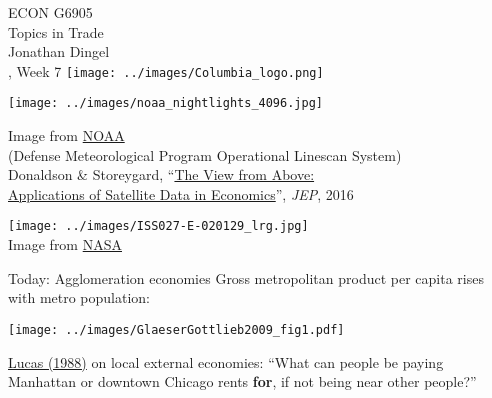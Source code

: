 \documentclass[11pt,notes=hide,aspectratio=169]{beamer}
\begin{document}
\begin{frame}[plain]
\begin{center}
\large
\textcolor{columbiadarkblue}{ECON G6905\\
Topics in Trade\\ 
Jonathan Dingel\\
\semester, Week 7}
\vfill 
\texttt{[image: ../images/Columbia\_logo.png]}
\end{center}
\end{frame}
\begin{frame}[plain]
\begin{center}
\texttt{[image: ../images/noaa\_nightlights\_4096.jpg]} \\
{\small
Image from \href{ftp://public.sos.noaa.gov/land/earth_night/nightlights/4096.jpg}{NOAA} \\
(Defense Meteorological Program Operational Linescan System)\\
Donaldson \& Storeygard, ``\href{https://www.aeaweb.org/articles?id=10.1257/jep.30.4.171}{The View from Above: \\ Applications of Satellite Data in Economics}'', \textit{JEP}, 2016
\par}
\end{center}
\end{frame}
\begin{frame}[plain]
\begin{center}
\texttt{[image: ../images/ISS027-E-020129\_lrg.jpg]} \\
Image from \href{https://visibleearth.nasa.gov/view.php?id=50671
}{NASA}
\end{center}
\end{frame}
\begin{frame}{Today: Agglomeration economies}
Gross metropolitan product per capita rises with metro population:
\begin{center}
\texttt{[image: ../images/GlaeserGottlieb2009\_fig1.pdf]}
\end{center}
\href{https://www.sciencedirect.com/science/article/pii/0304393288901687}{Lucas (1988)} on local external economies:
``What can people be paying Manhattan or downtown Chicago rents \textbf{for}, if not being near other people?''
\end{frame}
\end{document}
